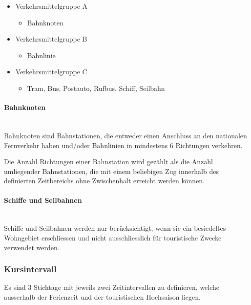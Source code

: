\begin{itemize}[noitemsep]
    \item Verkehrsmittelgruppe A
    \begin{itemize}
        \item Bahnknoten
    \end{itemize}
    \item Verkehrsmittelgruppe B
    \begin{itemize}
        \item Bahnlinie
    \end{itemize}
    \item Verkehrsmittelgruppe C
    \begin{itemize}
        \item Tram, Bus, Postauto, Rufbus, Schiff, Seilbahn
    \end{itemize}
\end{itemize}

\paragraph{Bahnknoten}~\\
Bahnknoten sind Bahnstationen, die entweder einen Anschluss an den nationalen Fernverkehr haben und/oder Bahnlinien in mindestens 6 Richtungen verkehren.

Die Anzahl Richtungen einer Bahnstation wird gezählt als die Anzahl umliegender Bahnstationen, die mit einem beliebigen Zug innerhalb des definierten Zeitbereichs ohne Zwischenhalt erreicht werden können.

\paragraph{Schiffe und Seilbahnen}~\\
Schiffe und Seilbahnen werden nur berücksichtigt, wenn sie ein besiedeltes Wohngebiet erschliessen und nicht ausschliesslich für touristische Zwecke verwendet werden.


\subsubsection{Kursintervall}
\label{Berechnungsmethodik OeVGK18:Kursintervall}
Es sind 3 Stichtage mit jeweils zwei Zeitintervallen zu definieren, welche ausserhalb der Ferienzeit und der touristischen Hochsaison liegen.

